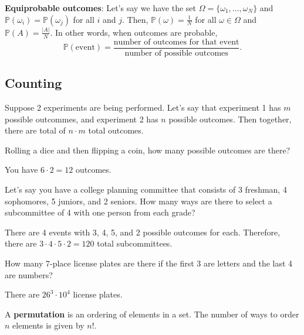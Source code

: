 \begin{definition}
	\textbf{Equiprobable outcomes}: Let's say we have the set \( \Omega =\{\omega_1, \ldots , \omega_N\}   \) and \( \mathbb{P}(\omega_i)=\mathbb{P}(\omega_j) \) for all \( i \) and \( j \). Then, \( \mathbb{P}(\omega) = \frac{1}{N} \) for all \( \omega  \in \Omega  \) and \( \mathbb{P}(A) = \frac{|A|}{N} \). In other words, when outcomes are probable, \[ \mathbb{P}(\text{event}) = \frac{\text{number of outcomes for that event}}{\text{number of possible outcomes}}.\]
\end{definition}

\subsection{Counting}

Suppose 2 experiments are being performed. Let's say that experiment 1 has \( m \) possible outcommes, and experiment 2 has \( n \) possible outcomes. Then together, there are total of \( n\cdot m \) total outcomes.

\begin{eg}
	Rolling a dice and then flipping a coin, how many possible outcomes are there?
\end{eg}
\begin{explanation}
	You have \( 6 \cdot 2 = 12  \) outcomes.
\end{explanation}

\begin{eg}
	Let's say you have a college planning committee that consists of 3 freshman, 4 sophomores, 5 juniors, and 2 seniors. How many ways are there to select a subcommittee of 4 with one person from each grade?
\end{eg}
\begin{explanation}
	There are 4 events with 3, 4, 5, and 2 possible outcomes for each. Therefore, there are \( 3\cdot 4\cdot 5\cdot 2=120 \) total subcommittees.
\end{explanation}

\begin{eg}
	How many 7-place license plates are there if the first 3 are letters and the last 4 are numbers?
\end{eg}
\begin{explanation}
	There are \( 26^3 \cdot 10^4 \) license plates.
\end{explanation}

\begin{definition}
	A \textbf{permutation} is an ordering of elements in a set. The number of ways to order \( n \) elements is given by \( n! \).
\end{definition}

